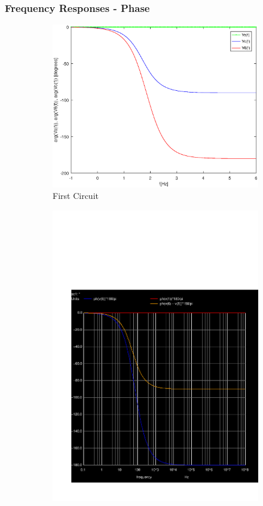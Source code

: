 \subsubsection{Frequency Responses - Phase}

\begin{figure}[H] 
\centering
\begin{subfigure}{0.4\textwidth}
\includegraphics[width=\textwidth]{Arguments.eps}
\caption{First Circuit}
\label{fig:first}
\end{subfigure}
\begin{subfigure}{0.4\textwidth}
\includegraphics[width=\textwidth]{sim5_ph.pdf}

\end{subfigure}
\end{figure}
